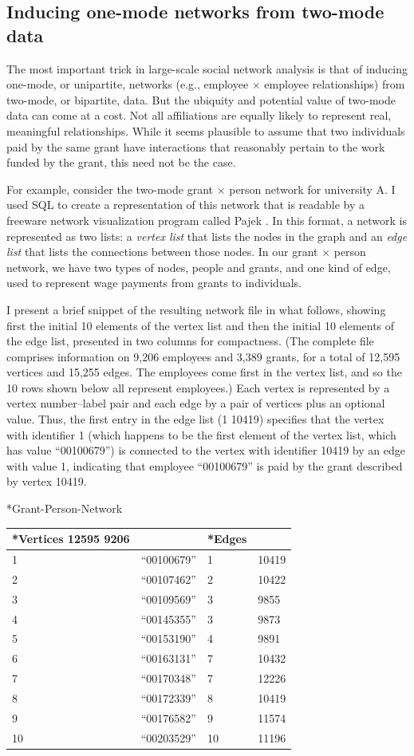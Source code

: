 \documentclass[]{krantz}
\begin{document}
\subsection{Inducing one-mode networks from two-mode
data}\label{inducing-one-mode-networks-from-two-mode-data}

The most important trick in large-scale social network analysis is that
of inducing one-mode, or unipartite, networks (e.g., employee \(\times\)
employee relationships) from two-mode, or bipartite, data. But the
ubiquity and potential value of two-mode data can come at a cost. Not
all affiliations are equally likely to represent real, meaningful
relationships. While it seems plausible to assume that two individuals
paid by the same grant have interactions that reasonably pertain to the
work funded by the grant, this need not be the case.

For example, consider the two-mode grant \(\times\) person network for
university A. I used SQL to create a representation of this network that
is readable by a freeware network visualization program called Pajek
\citep{batagelj1998pajek}. In this format, a network is represented as
two lists: a \emph{vertex list} that lists the nodes in the graph and an
\emph{edge list} that lists the connections between those nodes. In our
grant \(\times\) person network, we have two types of nodes, people and
grants, and one kind of edge, used to represent wage payments from
grants to individuals.

I present a brief snippet of the resulting network file in what follows,
showing first the initial 10 elements of the vertex list and then the
initial 10 elements of the edge list, presented in two columns for
compactness. (The complete file comprises information on 9,206 employees
and 3,389 grants, for a total of 12,595 vertices and 15,255 edges. The
employees come first in the vertex list, and so the 10 rows shown below
all represent employees.) Each vertex is represented by a vertex
number--label pair and each edge by a pair of vertices plus an optional
value. Thus, the first entry in the edge list (1 10419) specifies that
the vertex with identifier 1 (which happens to be the first element of
the vertex list, which has value ``00100679'') is connected to the
vertex with identifier 10419 by an edge with value 1, indicating that
employee ``00100679'' is paid by the grant described by vertex 10419.

*Grant-Person-Network

\begin{longtable}[]{@{}llll@{}}
\toprule
*Vertices 12595 9206 & & *Edges &\tabularnewline
\midrule
\endhead
1 & ``00100679'' & 1 & 10419\tabularnewline
2 & ``00107462'' & 2 & 10422\tabularnewline
3 & ``00109569'' & 3 & 9855\tabularnewline
4 & ``00145355'' & 3 & 9873\tabularnewline
5 & ``00153190'' & 4 & 9891\tabularnewline
6 & ``00163131'' & 7 & 10432\tabularnewline
7 & ``00170348'' & 7 & 12226\tabularnewline
8 & ``00172339'' & 8 & 10419\tabularnewline
9 & ``00176582'' & 9 & 11574\tabularnewline
10 & ``00203529'' & 10 & 11196\tabularnewline
\bottomrule
\end{longtable}
\end{document}
